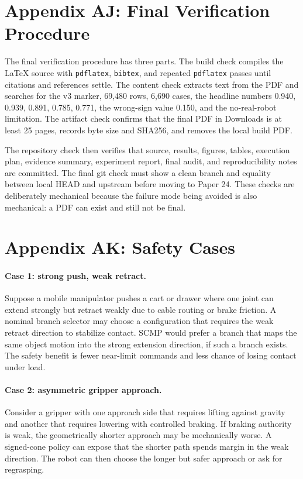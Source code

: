 \documentclass{article}
\begin{document}
\section*{Appendix AJ: Final Verification Procedure}

The final verification procedure has three parts. The build check compiles the LaTeX source with \texttt{pdflatex}, \texttt{bibtex}, and repeated \texttt{pdflatex} passes until citations and references settle. The content check extracts text from the PDF and searches for the v3 marker, 69,480 rows, 6,690 cases, the headline numbers 0.940, 0.939, 0.891, 0.785, 0.771, the wrong-sign value 0.150, and the no-real-robot limitation. The artifact check confirms that the final PDF in Downloads is at least 25 pages, records byte size and SHA256, and removes the local build PDF.

The repository check then verifies that source, results, figures, tables, execution plan, evidence summary, experiment report, final audit, and reproducibility notes are committed. The final git check must show a clean branch and equality between local HEAD and upstream before moving to Paper 24. These checks are deliberately mechanical because the failure mode being avoided is also mechanical: a PDF can exist and still not be final.

\section*{Appendix AK: Safety Cases}

\paragraph{Case 1: strong push, weak retract.}
Suppose a mobile manipulator pushes a cart or drawer where one joint can extend strongly but retract weakly due to cable routing or brake friction. A nominal branch selector may choose a configuration that requires the weak retract direction to stabilize contact. SCMP would prefer a branch that maps the same object motion into the strong extension direction, if such a branch exists. The safety benefit is fewer near-limit commands and less chance of losing contact under load.

\paragraph{Case 2: asymmetric gripper approach.}
Consider a gripper with one approach side that requires lifting against gravity and another that requires lowering with controlled braking. If braking authority is weak, the geometrically shorter approach may be mechanically worse. A signed-cone policy can expose that the shorter path spends margin in the weak direction. The robot can then choose the longer but safer approach or ask for regrasping.
\end{document}
